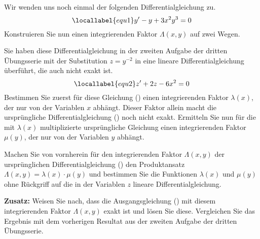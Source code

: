\begin{atiTask}[
  title = Konstruktion eines integrierenden Faktors
]
  Wir wenden uns noch einmal der folgenden Differentialgleichung zu.
  \begin{equation}
    \locallabel{equ1}
     y' - y + 3x^2y^3 = 0
  \end{equation}
  Konstruieren Sie nun einen integrierenden Faktor $\Lambda(x,y)$ auf zwei Wegen.
  \begin{atiSubtasks}
    \item{
      Sie haben diese Differentialgleichung in der zweiten Aufgabe der dritten Übungsserie mit der Substitution $z = y^{-2}$ in eine lineare Differentialgleichung überführt, die auch nicht exakt ist.
      \begin{equation}
        \locallabel{equ2}
        z' + 2z - 6x^2 = 0
      \end{equation}
      Bestimmen Sie zuerst für diese Gleichung () einen integrierenden Faktor $\lambda(x)$, der nur von der Variablen $x$ abhängt.
      Dieser Faktor allein macht die ursprüngliche Differentialgleichung () noch nicht exakt.
      Ermitteln Sie nun für die mit $\lambda(x)$ multiplizierte ursprüngliche Gleichung einen integrierenden Faktor $\mu(y)$, der nur von der Variablen $y$ abhängt.
    }
    \item{
      Machen Sie von vornherein für den integrierenden Faktor $\Lambda(x,y)$ der ursprünglichen Differentialgleichung () den Produktansatz $\Lambda(x,y)=\lambda(x)\cdot\mu(y)$ und bestimmen Sie die Funktionen $\lambda(x)$ und $\mu(y)$ ohne Rückgriff auf die in der Variablen $z$ lineare Differentialgleichung.
    }
    \item{
      \textbf{Zusatz:}
      Weisen Sie nach, dass die Ausgangsgleichung () mit diesem integrierenden Faktor $\Lambda(x,y)$ exakt ist und lösen Sie diese.
      Vergleichen Sie das Ergebnis mit dem vorherigen Resultat aus der zweiten Aufgabe der dritten Übungsserie.
    }
  \end{atiSubtasks}
\end{atiTask}